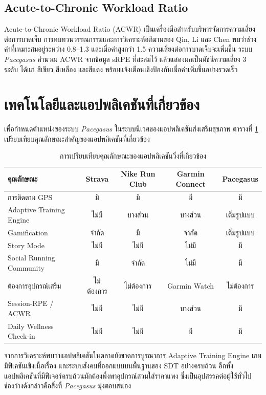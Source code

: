 \subsection{Acute-to-Chronic Workload Ratio}

Acute-to-Chronic Workload Ratio (ACWR) เป็นเครื่องมือสำหรับบริหารจัดการความเสี่ยงต่อการบาดเจ็บ การทบทวนวรรณกรรมและการวิเคราะห์อภิมานของ Qin, Li และ Chen \cite{qin2025} พบว่าช่วงค่าที่เหมาะสมอยู่ระหว่าง 0.8--1.3 และเมื่อค่าสูงกว่า 1.5 ความเสี่ยงต่อการบาดเจ็บจะเพิ่มขึ้น ระบบ \textit{Pacegasus} คำนวณ ACWR จากข้อมูล sRPE ที่สะสมไว้ แล้วแสดงผลเป็นดัชนีความเสี่ยง 3 ระดับ ได้แก่ สีเขียว สีเหลือง และสีแดง พร้อมแจ้งเตือนเชิงป้องกันเมื่อค่าเพิ่มขึ้นอย่างรวดเร็ว

\section{เทคโนโลยีและแอปพลิเคชันที่เกี่ยวข้อง}

เพื่อกำหนดตำแหน่งของระบบ \textit{Pacegasus} ในระบบนิเวศของแอปพลิเคชันส่งเสริมสุขภาพ ตารางที่ \ref{tab:running-app-comparison} เปรียบเทียบคุณลักษณะสำคัญของแอปพลิเคชันที่เกี่ยวข้อง

\begin{table}[htbp]
\centering
\caption{การเปรียบเทียบคุณลักษณะของแอปพลิเคชันวิ่งที่เกี่ยวข้อง}
\label{tab:running-app-comparison}
\footnotesize
\begin{tabular}{p{}cccc}
\hline
\textbf{คุณลักษณะ} & \textbf{Strava} & \textbf{Nike Run Club} & \textbf{Garmin Connect} & \textbf{Pacegasus} \\
\hline
การติดตาม GPS & มี & มี & มี & มี \\
Adaptive Training Engine & ไม่มี & บางส่วน & บางส่วน & เต็มรูปแบบ \\
Gamification & จำกัด & มี & จำกัด & เต็มรูปแบบ \\
Story Mode & ไม่มี & ไม่มี & ไม่มี & มี \\
Social Running Community & มี & จำกัด & ไม่มี & มี \\
ต้องการอุปกรณ์เสริม & ไม่ต้องการ & ไม่ต้องการ & Garmin Watch & ไม่ต้องการ \\
Session-RPE / ACWR & ไม่มี & ไม่มี & บางส่วน & มี \\
Daily Wellness Check-in & ไม่มี & ไม่มี & มี & มี \\
\hline
\end{tabular}
\end{table}

จากการวิเคราะห์พบว่าแอปพลิเคชันในตลาดยังขาดการบูรณาการ Adaptive Training Engine เกมมิฟิเคชันเชิงเนื้อเรื่อง และระบบสังคมที่ออกแบบบนพื้นฐานของ SDT อย่างครบถ้วน อีกทั้งแอปพลิเคชันที่มีฟีเจอร์ครบถ้วนมักต้องพึ่งพาอุปกรณ์สวมใส่ราคาแพง ซึ่งเป็นอุปสรรคต่อผู้ใช้ทั่วไป ช่องว่างดังกล่าวคือสิ่งที่ \textit{Pacegasus} มุ่งตอบสนอง

